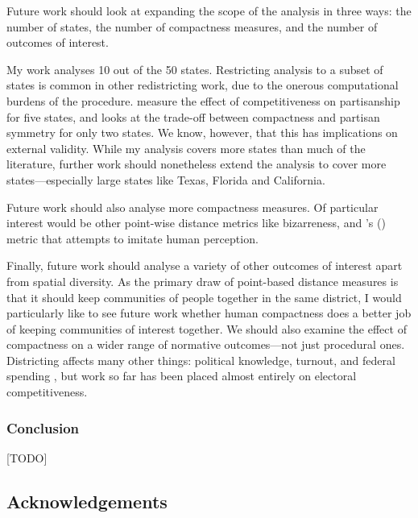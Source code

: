 \documentclass[]{article}
\begin{document}
Future work should look at expanding the scope of the analysis in three
ways: the number of states, the number of compactness measures, and the
number of outcomes of interest.

My work analyses 10 out of the 50 states. Restricting analysis to a
subset of states is common in other redistricting work, due to the
onerous computational burdens of the procedure. \cite{ddj2019comp}
measure the effect of competitiveness on partisanship for five states,
and \cite{s2020} looks at the trade-off between compactness and partisan
symmetry for only two states. We know, however, that this has
implications on external validity. While my analysis covers more states
than much of the literature, further work should nonetheless extend the
analysis to cover more states---especially large states like Texas,
Florida and California.

Future work should also analyse more compactness measures. Of particular
interest would be other point-wise distance metrics like bizarreness,
and \citeauthor{kingwp}'s (\citeyear{kingwp}) metric that attempts to
imitate human perception.

Finally, future work should analyse a variety of other outcomes of
interest apart from spatial diversity. As the primary draw of
point-based distance measures is that it should keep communities of
people together in the same district, I would particularly like to see
future work whether human compactness does a better job of keeping
communities of interest together. We should also examine the effect of
compactness on a wider range of normative outcomes---not just procedural
ones. Districting affects many other things: political knowledge,
turnout, and federal spending \citep{snyder2010}, but work so far has
been placed almost entirely on electoral competitiveness.

\hypertarget{conclusion}{%
\subsubsection{Conclusion}\label{conclusion}}

{[}TODO{]}

\hypertarget{acknowledgements}{%
\subsection{Acknowledgements}\label{acknowledgements}}
\end{document}
